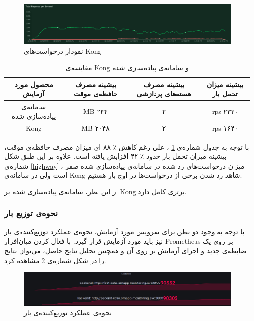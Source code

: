 \begin{figure}[H]
    \centering
    \label{kong}
    \includegraphics[scale=0.25]{images/KongStats.png}
    \caption{نمودار درخواست‌های Kong}
\end{figure}

\begin{table}[H]
    \centering
    \caption{مقایسه‌ی Kong و سامانه‌ی پیاده‌سازی شده}\label{tab:kongvshighway}
    \begin{tabular}{|c|c|c|c|}
        \hline
        محصول مورد آزمایش & بیشینه مصرف حافظه‌ی موقت & بیشینه مصرف هسته‌های پردازشی & بیشینه میزان تحمل بار\\
        \hline
        سامانه‌ی پیاده‌سازی شده & MB ۲۴۴  & ۲ & rps ۲۳۳۰ \\
        \hline
        Kong & MB ۲۰۴۸ & ۲ & rps ۱۶۴۰ \\
        \hline
    \end{tabular}
\end{table}

با توجه به جدول شماره‌ی
\ref{tab:kongvshighway}
، علی رغم کاهش ٪ ۸۸ ای میزان مصرف حافظه‌ی موقت، بیشینه میزان تحمل بار حدود ٪ ۴۲ افزایش یافته است. علاوه بر این طبق شکل شماره‌ی
\ref{highway}
، میزان درخواست‌های رد شده در سامانه‌ی پیاده‌سازی شده صفر است ولی در سامانه‌ی Kong شاهد رد شدن برخی از درخواست‌ها در اوج بار هستیم.

از این نظر، سامانه‌ی پیاده‌سازی شده بر Kong برتری کامل دارد.

\subsubsection{نحوه‌ی توزیع بار}
با توجه به وجود دو بطن برای سرویس مورد آزمایش، نحوه‌ی عملکرد توزیع‌کننده‌ی بار نیز باید مورد آزمایش قرار گیرد. با فعال کردن میان‌افزار Prometheus بر روی یک ضابطه‌ی جدید و اجرای آزمایش بر روی آن و همچنین تحلیل نتایج حاصل، می‌توان نتایج را در شکل شماره‌ی
\ref{load}
مشاهده کرد.

\begin{figure}[H]
    \centering
    \label{load}
    \includegraphics[scale=0.23]{images/LoadBalanceStats.png}
    \caption{نحوه‌ی عملکرد توزیع‌کننده‌ی بار}
\end{figure}

